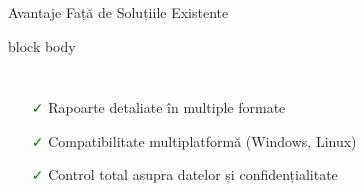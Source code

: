 \documentclass[aspectratio=169,9pt]{beamer}
\begin{document}
\begin{frame}{Avantaje Față de Soluțiile Existente}
\begin{beamercolorbox}[rounded=true,shadow=true,sep=0.7em]{block body}
\begin{columns}[T]
                                \footnotesize
                                \begin{itemize}[leftmargin=0.5cm,itemsep=0.05cm]
                                        \item[\textcolor{green}{\faCheck}] Rapoarte detaliate în multiple formate
                                        \item[\textcolor{green}{\faCheck}] Compatibilitate multiplatformă (Windows, Linux)
                                        \item[\textcolor{green}{\faCheck}] Control total asupra datelor și confidențialitate
                                \end{itemize}
                \end{columns}
        \end{beamercolorbox}
\end{frame}
\end{document}
